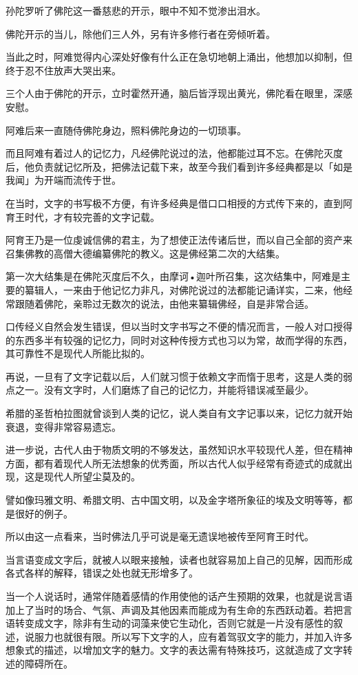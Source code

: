 \documentclass[twoside,openany]{book}
\begin{document}
孙陀罗听了佛陀这一番慈悲的开示，眼中不知不觉渗出泪水。

佛陀开示的当儿，除他们三人外，另有许多修行者在旁倾听着。

当此之时，阿难觉得内心深处好像有什么正在急切地朝上涌出，他想加以抑制，但终于忍不住放声大哭出来。

三个人由于佛陀的开示，立时霍然开通，脑后皆浮现出黄光，佛陀看在眼里，深感安慰。

阿难后来一直随侍佛陀身边，照料佛陀身边的一切琐事。

而且阿难有着过人的记忆力，凡经佛陀说过的法，他都能过耳不忘。在佛陀灭度后，他负责就记忆所及，把佛法记载下来，故至今我们看到许多经典都是以「如是我闻」为开端而流传于世。

在当时，文字的书写极不方便，有许多经典是借口口相授的方式传下来的，直到阿育王时代，才有较完善的文字记载。

阿育王乃是一位虔诚信佛的君主，为了想使正法传诸后世，而以自己全部的资产来召集佛教的高僧大德编纂佛陀的教义。这是佛经第二次的大结集。

第一次大结集是在佛陀灭度后不久，由摩诃•迦叶所召集，这次结集中，阿难是主要的纂辑人，一来由于他记忆力非凡，对佛陀说过的法都能记诵详实，二来，他经常跟随着佛陀，亲聆过无数次的说法，由他来纂辑佛经，自是非常合适。

口传经义自然会发生错误，但以当时文字书写之不便的情况而言，一般人对口授得的东西多半有较强的记忆力，同时对这种传授方式也习以为常，故而学得的东西，其可靠性不是现代人所能比拟的。

再说，一旦有了文字记载以后，人们就习惯于依赖文字而惰于思考，这是人类的弱点之一。没有文字时，人们磨炼了自己的记忆力，并能将错误减至最少。

希腊的圣哲柏拉图就曾谈到人类的记忆，说人类自有文字记事以来，记忆力就开始衰退，变得非常容易遗忘。

进一步说，古代人由于物质文明的不够发达，虽然知识水平较现代人差，但在精神方面，都有着现代人所无法想象的优秀面，所以古代人似乎经常有奇迹式的成就出现，这是现代人所望尘莫及的。

譬如像玛雅文明、希腊文明、古中国文明，以及金字塔所象征的埃及文明等等，都是很好的例子。

所以由这一点看来，当时佛法几乎可说是毫无遗误地被传至阿育王时代。

当言语变成文字后，就被人以眼来接触，读者也就容易加上自己的见解，因而形成各式各样的解释，错误之处也就无形增多了。

当一个人说话时，通常伴随着感情的作用使他的话产生预期的效果，也就是说言语加上了当时的场合、气氛、声调及其他因素而能成为有生命的东西跃动着。若把言语转变成文字，除非有生动的词藻来使它生动化，否则它就是一片没有感性的叙述，说服力也就很有限。所以写下文字的人，应有着驾驭文字的能力，并加入许多想象式的描述，以增加文字的魅力。文字的表达需有特殊技巧，这就造成了文字转述的障碍所在。
\end{document}
